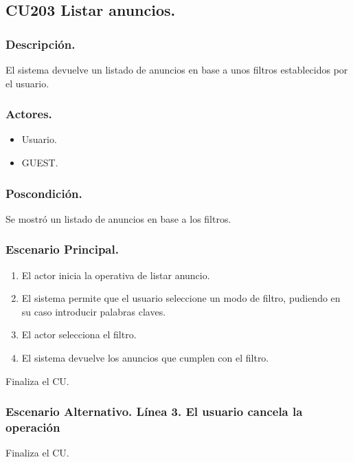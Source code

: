 \subsection{CU203 Listar anuncios.}
\subsubsection{Descripci\'{o}n.}
El sistema devuelve un listado de anuncios en base a unos filtros establecidos por el usuario.
\subsubsection{Actores.}
\begin{itemize}
\item Usuario.
\item GUEST.
\end{itemize}
\subsubsection{Poscondici\'{o}n.}
Se mostr\'{o} un listado de anuncios en base a los filtros.
\subsubsection{Escenario Principal.}
\begin{enumerate}
\item El actor inicia la operativa de listar anuncio.
\item El sistema permite que el usuario seleccione un modo de filtro, pudiendo en su caso introducir palabras claves.
\item El actor selecciona el filtro.
\item El sistema devuelve los anuncios que cumplen con el filtro.
\end{enumerate}
Finaliza el CU.
\subsubsection{Escenario Alternativo. L\'{i}nea 3. El usuario cancela la operaci\'{o}n}
Finaliza el CU.